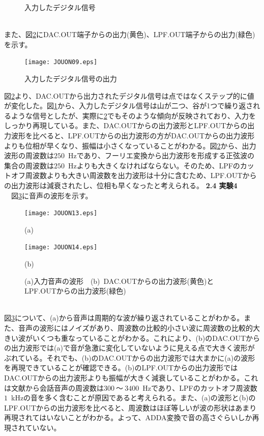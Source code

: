 \documentclass[a4paper,10.5pt]{ltjsarticle}
\begin{document}
\begin{figure}[h]
  \centering
  
  \vspace{-30pt}\caption{入力したデジタル信号}
  \label{fig:digitalsignal}
\end{figure}\\
また、図\ref{digitalsignaloutput}にDAC.OUT端子からの出力(黄色)、LPF.OUT端子からの出力(緑色)を示す。
\clearpage
\begin{figure}[h]
  \centering
  \texttt{[image: JOUON09.eps]}
  \caption{入力したデジタル信号の出力}
  \label{digitalsignaloutput}
\end{figure}
図\ref{digitalsignaloutput}より、DAC.OUTから出力されたデジタル信号は点ではなくステップ的に値が変化した。図\ref{fig:digitalsignal}から、入力したデジタル信号は山が二つ、谷が1つで繰り返されるような信号としたが、実際に\ref{digitalsignaloutput}でもそのような傾向が反映されており、入力をしっかり再現している。また、DAC.OUTからの出力波形とLPF.OUTからの出力波形を比べると、LPF.OUTからの出力波形の方がDAC.OUTからの出力波形よりも位相が早くなり、振幅は小さくなっていることがわかる。図\ref{digitalsignaloutput}から、出力波形の周波数は$250$\ Hzであり、フーリエ変換から出力波形を形成する正弦波の集合の周波数は$250$\ Hzよりも大きくなければならない。そのため、LPFのカットオフ周波数よりも大きい周波数を出力波形は十分に含むため、LPF.OUTからの出力波形は減衰されたし、位相も早くなったと考えられる。
\clearpage
{\large \bfseries 2.4 実験4}\\
　図\ref{voice1}に音声の波形を示す。
\begin{figure}[h]
  \hspace{27pt}\begin{minipage}[h]{0.45\linewidth}
    \texttt{[image: JOUON13.eps]}
    \caption*{(a)}
  \end{minipage}
  \begin{minipage}[h]{0.45\linewidth}
    \texttt{[image: JOUON14.eps]}
    \caption*{(b)}
  \end{minipage}
  \caption{(a)入力音声の波形\ \ (b)\ DAC.OUTからの出力波形(黄色)とLPF.OUTからの出力波形(緑色)}
  \label{voice1}
\end{figure}\\
図\ref{voice1}について、(a)から音声は周期的な波が繰り返されていることがわかる。また、音声の波形にはノイズがあり、周波数の比較的小さい波に周波数の比較的大きい波がいくつも重なっていることがわかる。これにより、(b)のDAC.OUTからの出力波形では(a)で音が急激に変化していないように見える点で大きく波形がぶれている。それでも、(b)のDAC.OUTからの出力波形では大まかに(a)の波形を再現できていることが確認できる。(b)のLPF.OUTからの出力波形ではDAC.OUTからの出力波形よりも振幅が大きく減衰していることがわかる。これは文献\cite{voice}から会話音声の周波数は$300\ 〜\ 3400$\ Hzであり、LPFのカットオフ周波数$1$\ kHzの音を多く含むことが原因であると考えられる。また、(a)の波形と(b)のLPF.OUTからの出力波形を比べると、周波数はほぼ等しいが波の形状はあまり再現されてはいないことがわかる。よって、ADDA変換で音の高さぐらいしか再現されていない。\\
\end{document}
